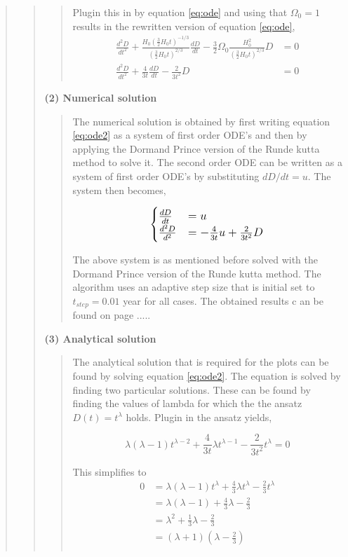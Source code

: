 \begin{quote}
\begin{quote}
\begin{quote}
Plugin this in by equation \ref{eq:ode} and using that $\Omega_0 = 1$  results in the rewritten version of equation \ref{eq:ode},
\begin{align}
\frac{d^2D}{dt^2} + \frac{H_0 \left(\frac{3}{2} H_0 t \right)^{-1/3}}{\left(\frac{3}{2} H_0 t \right)^{2/3}} \frac{dD}{dt} - \frac{3}{2} \Omega_0 \frac{H_0^2}{\left(\frac{3}{2} H_0 t \right)^{2/3}}D &= 0 \\
\frac{d^2D}{dt^2} + \frac{4}{3t} \frac{dD}{dt} - \frac{2}{3t^2}D &= 0
\label{eq:ode2}
\end{align}
\end{quote}

\textbf{(2) Numerical solution}
\begin{quote}
The numerical solution is obtained by first writing equation \ref{eq:ode2} as a system of first order ODE's and then by applying the Dormand\- Prince version of the Runde kutta method to solve it. The second order ODE  can be written as a system of first order ODE's by substituting $dD/dt = u$. The system then becomes,

\begin{equation}
\large
\begin{cases} 
\frac{dD}{dt} &= u \\ 
\frac{d^2D}{d^2} &= - \frac{4}{3t}u + \frac{2}{3t^2}D 
\end{cases}
\end{equation}

The above system is as mentioned before solved with the Dormand\- Prince version of the Runde kutta method. The algorithm uses an adaptive step size that is initial set to $t_{step} = 0.01$ year for all cases. The obtained results c an be found on page .....
\end{quote}

\textbf{(3) Analytical solution}
\begin{quote}
The analytical solution that is required for the plots can be found by solving equation \ref{eq:ode2}. The equation is solved by finding two particular solutions. These can be found by finding the values of lambda for which the the ansatz $D(t) = t^{\lambda}$ holds. Plugin in the ansatz yields,

\begin{equation}
\lambda \left(\lambda -1 \right) t^{\lambda - 2} + \frac{4}{3t} \lambda t^{\lambda -1} - \frac{2}{3t^2}t^{\lambda} = 0
\end{equation}

This simplifies to
\begin{align*}
0 & = \lambda \left( \lambda -1 \right) t^{\lambda} + \frac{4}{3} \lambda t^{\lambda} - \frac{2}{3} t^{\lambda}  \\
&= \lambda ( \lambda -1 ) + \frac{4}{3} \lambda - \frac{2}{3}  \\
&= \lambda^2 + \frac{1}{3} \lambda - \frac{2}{3} \\
&= (\lambda + 1) (\lambda - \frac{2}{3} )  \\
\end{align*}


\end{quote}
\end{quote}
\end{quote}
